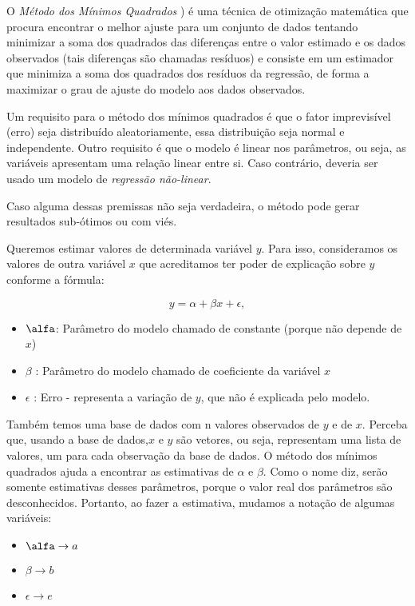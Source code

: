 O \textit{Método dos Mínimos Quadrados} ) é uma técnica de otimização matemática que procura encontrar o melhor ajuste para um conjunto de dados tentando minimizar a soma dos quadrados das diferenças entre o valor estimado e os dados observados (tais diferenças são chamadas resíduos) e consiste em um estimador que minimiza a soma dos quadrados dos resíduos da regressão, de forma a maximizar o grau de ajuste do modelo aos dados observados.

Um requisito para o método dos mínimos quadrados é que o fator imprevisível (erro) seja distribuído aleatoriamente, essa distribuição seja normal e independente. Outro requisito é que o modelo é linear nos parâmetros, ou seja, as variáveis apresentam uma relação linear entre si. Caso contrário, deveria ser usado um modelo de \textit{regressão não-linear}.


Caso alguma dessas premissas não seja verdadeira, o método pode gerar resultados sub-ótimos ou com viés.

Queremos estimar valores de determinada variável $y$. Para isso, consideramos os valores de outra variável $x$ que acreditamos ter poder de explicação sobre $y$ conforme a fórmula:

\begin{equation}
	y = \alpha + \beta x + \epsilon,
\end{equation}

\begin{itemize}
	\item $\alfa $: Parâmetro do modelo chamado de constante (porque não depende de $x$)
	\item $\beta$ :  Parâmetro do modelo chamado de coeficiente da variável $x$
	\item $\epsilon$ : Erro - representa a variação de $y$, que não é explicada pelo modelo.
\end{itemize}

Também temos uma base de dados com n valores observados de $y$ e de $x$. Perceba que, usando a base de dados,$x$ e $y$ são vetores, ou seja, representam uma lista de valores, um para cada observação da base de dados. O método dos mínimos quadrados ajuda a encontrar as estimativas de $\alpha$ e $\beta$. Como o nome diz, serão somente estimativas desses parâmetros, porque o valor real dos parâmetros são desconhecidos. Portanto, ao fazer a estimativa, mudamos a notação de algumas variáveis:
\begin{itemize}
	\item $\alfa \rightarrow a$
	\item $\beta \rightarrow b$
	\item $\epsilon \rightarrow e$
\end{itemize}

